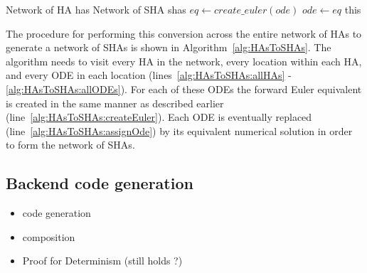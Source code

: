 \renewcommand{\algorithmiccomment}[1]{// #1}
\renewcommand{\algorithmicrequire}{\textbf{Input:}}
\renewcommand{\algorithmicensure}{\textbf{Output:}}
\begin{algorithm}[t!]
	\begin{algorithmic}[1]
		\REQUIRE Network of HA has 
		\ENSURE Network of SHA shas
		 \label{alg:HAsToSHAs:allHAs}
			  \label{alg:HAsToSHAs:allLocs}
				 \label{alg:HAsToSHAs:allODEs}
					\STATE $eq \leftarrow create\_euler(ode)$ \label{alg:HAsToSHAs:createEuler}
					\STATE $ode \leftarrow eq$ \label{alg:HAsToSHAs:assignOde}
				\ENDFOR
			\ENDFOR
		\ENDFOR
		\RETURN this
	\end{algorithmic}
	\caption{The algorithm to generate a Network of \acp{SHA} from a Network of \acp{HA}}
	\label{alg:HAsToSHAs}
\end{algorithm}

The procedure for performing this conversion across the entire network of \acp{HA} to generate a network of \acp{SHA} is shown in Algorithm~\ref{alg:HAsToSHAs}.
The algorithm needs to visit every \ac{HA} in the network, every location within each \ac{HA}, and every \ac{ODE} in each location (lines~\ref{alg:HAsToSHAs:allHAs} - \ref{alg:HAsToSHAs:allODEs}).
For each of these \acp{ODE} the forward Euler equivalent is created in the same manner as described earlier (line~\ref{alg:HAsToSHAs:createEuler}).
Each \ac{ODE} is eventually replaced (line~\ref{alg:HAsToSHAs:assignOde}) by its equivalent numerical solution in order to form the network of \acp{SHA}.

\subsection{Backend code generation}
\label{sec:backendCodeGeneration}


\begin{itemize}
	\item code generation
	\item composition
	\item Proof for Determinism (still holds ?)
\end{itemize}